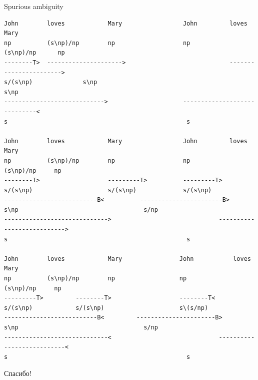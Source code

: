 \documentclass{beamer}
\begin{document}
\begin{frame}[fragile]{Spurious ambiguity}
\begin{tiny}
\begin{verbatim}
John        loves            Mary                 John         loves          Mary
np          (s\np)/np        np                   np           (s\np)/np      np
--------T>  --------------------->                             ----------------------->
s/(s\np)              s\np                                              s\np
---------------------------->                     -----------------------------<
s                                                  s

John        loves            Mary                 John         loves          Mary 
np          (s\np)/np        np                   np           (s\np)/np     np
--------T>                   ---------T>          ---------T>
s/(s\np)                     s/(s\np)             s/(s\np)
--------------------------B<          -----------------------B>
s\np                                   s/np
----------------------------->                              --------------------------->
s                                                  s

John        loves            Mary                John           loves         Mary
np          (s\np)/np        np                  np             (s\np)/np     np
---------T>         --------T>                   --------T<
s/(s\np)            s/(s\np)                     s\(s/np)
--------------------------B<         ----------------------B>
s\np                                   s/np
-----------------------------<                              ---------------------------<
s                                                  s
\end{verbatim}
\end{tiny}
\end{frame}







\begin{frame}{}
\thispagestyle{empty}
\begin{center}
	{\large Спасибо!}
\end{center}
\end{frame}
\end{document}

